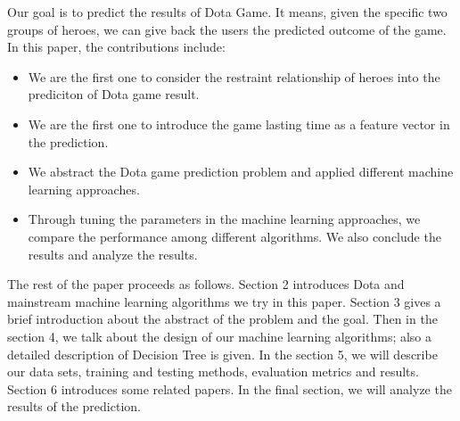 Our goal is to predict the results of Dota Game.
It means, given the specific two groups of heroes, we can give back the users the predicted outcome of the game.
In this paper, the contributions include:

\begin{itemize}
\item We are the first one to consider the restraint relationship of heroes into the prediciton of Dota game result. 
\item We are the first one to introduce the game lasting time as a feature vector in the prediction. 
\item We abstract the Dota game prediction problem and applied different machine learning approaches.
\item Through tuning the parameters in the machine learning approaches, we compare the performance among different algorithms. We also conclude the results and analyze the results.
\end{itemize}

The rest of the paper proceeds as follows.
Section 2 introduces Dota and mainstream machine learning algorithms we try in this paper.
Section 3 gives a brief introduction about the abstract of the problem and the goal.
Then in the section 4, we talk about the design of our machine learning algorithms; also a detailed description of Decision Tree is given.
In the section 5, we will describe our data sets, training and testing methods, evaluation metrics and results.
Section 6 introduces some related papers.
In the final section, we will analyze the results of the prediction.
